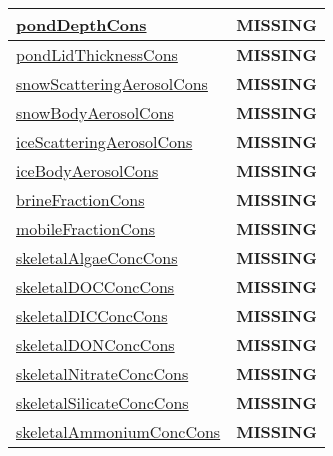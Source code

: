 {\begin{center}
\begin{longtable}{| p{2.0in} | p{4.0in} |}
    \hline
    \hyperref[subsec:var_sec_tracer_conservation_pondDepthCons]{pondDepthCons} & {\bf \color{red} MISSING} \\
    \hline
    \hyperref[subsec:var_sec_tracer_conservation_pondLidThicknessCons]{pondLidThicknessCons} & {\bf \color{red} MISSING} \\
    \hline
    \hyperref[subsec:var_sec_tracer_conservation_snowScatteringAerosolCons]{snowScatteringAerosolCons} & {\bf \color{red} MISSING} \\
    \hline
    \hyperref[subsec:var_sec_tracer_conservation_snowBodyAerosolCons]{snowBodyAerosolCons} & {\bf \color{red} MISSING} \\
    \hline
    \hyperref[subsec:var_sec_tracer_conservation_iceScatteringAerosolCons]{iceScatteringAerosolCons} & {\bf \color{red} MISSING} \\
    \hline
    \hyperref[subsec:var_sec_tracer_conservation_iceBodyAerosolCons]{iceBodyAerosolCons} & {\bf \color{red} MISSING} \\
    \hline
    \hyperref[subsec:var_sec_tracer_conservation_brineFractionCons]{brineFractionCons} & {\bf \color{red} MISSING} \\
    \hline
    \hyperref[subsec:var_sec_tracer_conservation_mobileFractionCons]{mobileFractionCons} & {\bf \color{red} MISSING} \\
    \hline
    \hyperref[subsec:var_sec_tracer_conservation_skeletalAlgaeConcCons]{skeletalAlgaeConcCons} & {\bf \color{red} MISSING} \\
    \hline
    \hyperref[subsec:var_sec_tracer_conservation_skeletalDOCConcCons]{skeletalDOCConcCons} & {\bf \color{red} MISSING} \\
    \hline
    \hyperref[subsec:var_sec_tracer_conservation_skeletalDICConcCons]{skeletalDICConcCons} & {\bf \color{red} MISSING} \\
    \hline
    \hyperref[subsec:var_sec_tracer_conservation_skeletalDONConcCons]{skeletalDONConcCons} & {\bf \color{red} MISSING} \\
    \hline
    \hyperref[subsec:var_sec_tracer_conservation_skeletalNitrateConcCons]{skeletalNitrateConcCons} & {\bf \color{red} MISSING} \\
    \hline
    \hyperref[subsec:var_sec_tracer_conservation_skeletalSilicateConcCons]{skeletalSilicateConcCons} & {\bf \color{red} MISSING} \\
    \hline
    \hyperref[subsec:var_sec_tracer_conservation_skeletalAmmoniumConcCons]{skeletalAmmoniumConcCons} & {\bf \color{red} MISSING} \\

\end{longtable}
\end{center}}
